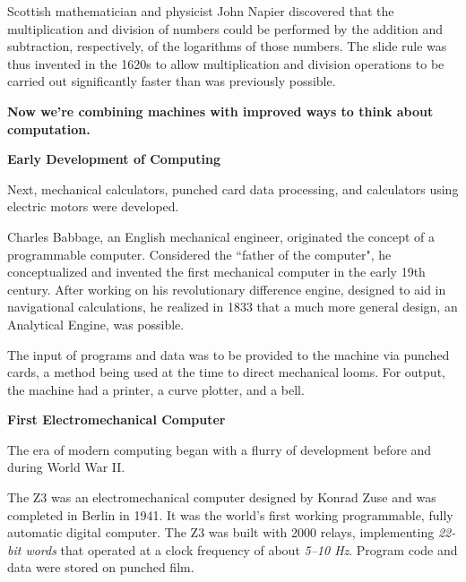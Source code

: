 \documentclass[12pt]{article}
\begin{document}
Scottish mathematician and physicist John Napier discovered that the multiplication and division of numbers could be performed by the addition and subtraction, respectively, of the logarithms of those numbers. The slide rule was thus invented in the 1620s to allow multiplication and division operations to be carried out significantly faster than was previously possible. 

\textbf{Now we're combining machines with improved ways to think about computation.}


\vspace*{2em}
\noindent \textbf{Early Development of Computing}

Next, mechanical calculators, punched card data processing, and calculators using electric motors were developed. 

Charles Babbage, an English mechanical engineer, originated the concept of a programmable computer. Considered the ``father of the computer", he conceptualized and invented the first mechanical computer in the early 19th century. After working on his revolutionary difference engine, designed to aid in navigational calculations, he realized in 1833 that a much more general design, an Analytical Engine, was possible. 

The input of programs and data was to be provided to the machine via punched cards, a method being used at the time to direct mechanical looms. For output, the machine had a printer, a curve plotter, and a bell. %

\vspace*{2em}
\noindent \textbf{First Electromechanical Computer}

The era of modern computing began with a flurry of development before and during World War II. 

The Z3 was an electromechanical computer designed by Konrad Zuse and was completed in Berlin in 1941. It was the world's first working programmable, fully automatic digital computer. The Z3 was built with 2000 relays, implementing \textit{22-bit words} that operated at a clock frequency of about \textit{5--10 Hz}. Program code and data were stored on punched film. %
\end{document}
